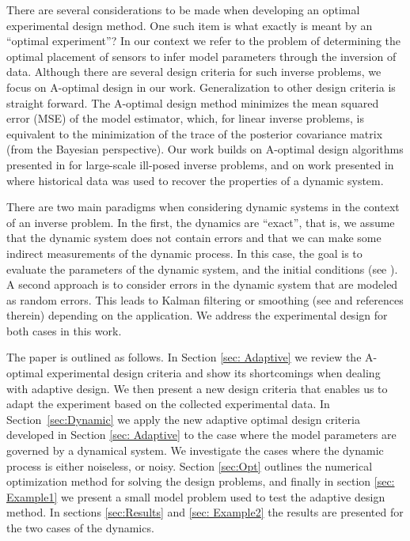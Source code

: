 \documentclass[leqno,onefignum,onetabnum]{siamltexmm}
\begin{document}
There are several considerations to be made when developing an optimal experimental design method. One such item is what exactly is meant by an ``optimal experiment''? In our context we refer to the problem of determining  the optimal placement of sensors to infer model parameters  through the inversion of  data. 
 Although there are several design criteria for such inverse problems,  we focus on A-optimal design in our work.
 Generalization to other design criteria is straight forward. 
 The A-optimal design method minimizes the mean squared error (MSE) of the model estimator, which, for linear inverse problems, is equivalent to the minimization of  the trace of the posterior covariance matrix (from the Bayesian perspective). Our work  builds on A-optimal design algorithms presented in \cite{Haber2011} for large-scale ill-posed inverse problems, and on work presented in \cite{Fohring2014} where historical data was used
 to recover the properties of a dynamic system. 
 
There are two main paradigms when considering dynamic systems in the context of an inverse problem. In the
first, the dynamics are ``exact'', that is, we assume that the dynamic system does not contain errors and that we can make some indirect measurements of the dynamic process. In this case,
the goal is to evaluate the parameters of the dynamic system, and the initial conditions (see \cite{Fohring2014}). 
A second approach  is
to consider errors in the dynamic system that are modeled as random errors. This leads to 
Kalman filtering or smoothing (see \cite{kalman1960,Aravkin2010} and references therein) depending on the application.
We address the experimental design for  both cases in this work. 

The paper is outlined as follows. In Section \ref{sec: Adaptive} we review the A-optimal experimental design
criteria and show its shortcomings when dealing with adaptive design.  We then present a new
design criteria that enables us to adapt the experiment based on the collected experimental data.
In Section~\ref{sec:Dynamic} we apply the new adaptive optimal design criteria developed in Section \ref{sec: Adaptive}
to the case where the model parameters are governed by a dynamical system. We investigate the cases where the dynamic process is either noiseless, or noisy. 
Section \ref{sec:Opt}  outlines the numerical optimization method for solving the design problems, and finally in section \ref{sec: Example1} we present a small model problem used to test the adaptive design method. In sections \ref{sec:Results} and \ref{sec: Example2} the results are presented for the two cases of the dynamics. 
\end{document}

